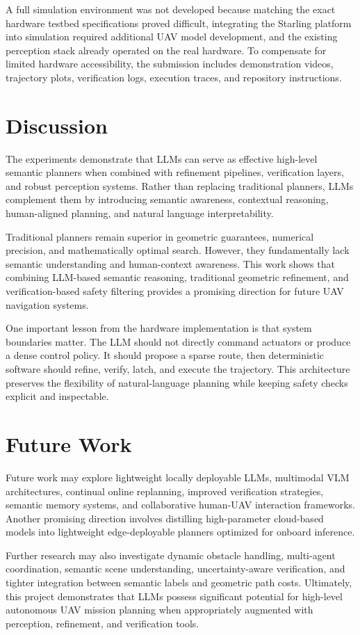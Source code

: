 \documentclass[11pt]{article}
\begin{document}
A full simulation environment was not developed because matching the exact hardware testbed specifications proved difficult, integrating the Starling platform into simulation required additional UAV model development, and the existing perception stack already operated on the real hardware. To compensate for limited hardware accessibility, the submission includes demonstration videos, trajectory plots, verification logs, execution traces, and repository instructions.

\section{Discussion}

The experiments demonstrate that LLMs can serve as effective high-level semantic planners when combined with refinement pipelines, verification layers, and robust perception systems. Rather than replacing traditional planners, LLMs complement them by introducing semantic awareness, contextual reasoning, human-aligned planning, and natural language interpretability.

Traditional planners remain superior in geometric guarantees, numerical precision, and mathematically optimal search. However, they fundamentally lack semantic understanding and human-context awareness. This work shows that combining LLM-based semantic reasoning, traditional geometric refinement, and verification-based safety filtering provides a promising direction for future UAV navigation systems.

One important lesson from the hardware implementation is that system boundaries matter. The LLM should not directly command actuators or produce a dense control policy. It should propose a sparse route, then deterministic software should refine, verify, latch, and execute the trajectory. This architecture preserves the flexibility of natural-language planning while keeping safety checks explicit and inspectable.

\section{Future Work}

Future work may explore lightweight locally deployable LLMs, multimodal VLM architectures, continual online replanning, improved verification strategies, semantic memory systems, and collaborative human-UAV interaction frameworks. Another promising direction involves distilling high-parameter cloud-based models into lightweight edge-deployable planners optimized for onboard inference.

Further research may also investigate dynamic obstacle handling, multi-agent coordination, semantic scene understanding, uncertainty-aware verification, and tighter integration between semantic labels and geometric path costs. Ultimately, this project demonstrates that LLMs possess significant potential for high-level autonomous UAV mission planning when appropriately augmented with perception, refinement, and verification tools.
\end{document}
